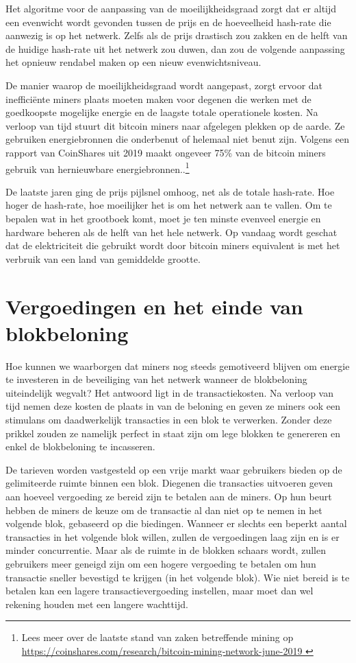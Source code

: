 Het algoritme voor de aanpassing van de moeilijkheidsgraad zorgt dat er altijd een evenwicht wordt gevonden tussen de prijs en de hoeveelheid hash-rate die aanwezig is op het netwerk. Zelfs als de prijs drastisch zou zakken en de helft van de huidige hash-rate uit het netwerk zou duwen, dan zou de volgende aanpassing het opnieuw rendabel maken op een nieuw evenwichtsniveau.

De manier waarop de moeilijkheidsgraad wordt aangepast, zorgt ervoor dat inefficiënte miners plaats moeten maken voor degenen die werken met de goedkoopste mogelijke energie en de laagste totale operationele kosten. Na verloop van tijd stuurt dit bitcoin miners naar afgelegen plekken op de aarde. Ze gebruiken energiebronnen die onderbenut of helemaal niet benut zijn. Volgens een rapport van CoinShares uit 2019 maakt ongeveer 75\% van de bitcoin miners gebruik van hernieuwbare energiebronnen..\footnote{Lees meer over de laatste stand van zaken betreffende mining op \href{https://coinshares.com/research/bitcoin-mining-network-june-2019 }{https://coinshares.com/research/bitcoin-mining-network-june-2019 }}

De laatste jaren ging de prijs pijlsnel omhoog, net als de totale hash-rate. Hoe hoger de hash-rate, hoe moeilijker het is om het netwerk aan te vallen. Om te bepalen wat in het grootboek komt, moet je ten minste evenveel energie en hardware beheren als de helft van het hele netwerk. Op vandaag wordt geschat dat de elektriciteit die gebruikt wordt door bitcoin miners equivalent is met het verbruik van een land van gemiddelde grootte.

\section{Vergoedingen en het einde van blokbeloning}

Hoe kunnen we waarborgen dat miners nog steeds gemotiveerd blijven om energie te investeren in de beveiliging van het netwerk wanneer de blokbeloning uiteindelijk wegvalt? Het antwoord ligt in de transactiekosten. Na verloop van tijd nemen deze kosten de plaats in van de beloning en geven ze miners ook een stimulans om daadwerkelijk transacties in een blok te verwerken. Zonder deze prikkel zouden ze namelijk perfect in staat zijn om lege blokken te genereren en enkel de blokbeloning te incasseren.

De tarieven worden vastgesteld op een vrije markt waar gebruikers bieden op de gelimiteerde ruimte binnen een blok. Diegenen die transacties uitvoeren geven aan hoeveel vergoeding ze bereid zijn te betalen aan de miners. Op hun beurt hebben de miners de keuze om de transactie al dan niet op te nemen in het volgende blok, gebaseerd op die biedingen. Wanneer er slechts een beperkt aantal transacties in het volgende blok willen, zullen de vergoedingen laag zijn en is er minder concurrentie. Maar als de ruimte in de blokken schaars wordt, zullen gebruikers meer geneigd zijn om een hogere vergoeding te betalen om hun transactie sneller bevestigd te krijgen (in het volgende blok). Wie niet bereid is te betalen kan een lagere transactievergoeding instellen, maar moet dan wel rekening houden met een langere wachttijd.

